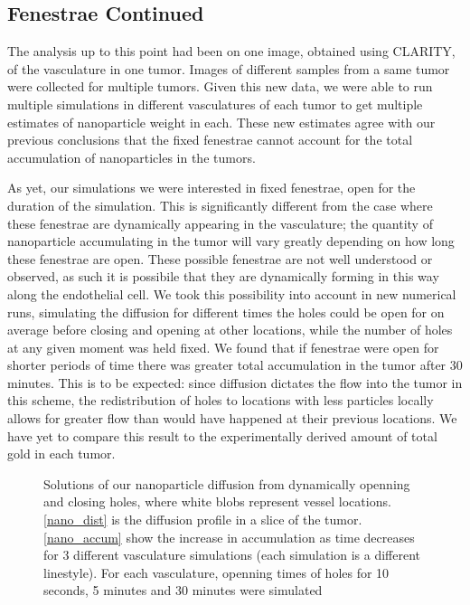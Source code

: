 \subsection{Fenestrae Continued}

The analysis up to this point had been on one image, obtained using CLARITY, of the vasculature in one tumor.
Images of different samples from a same tumor were collected for multiple tumors.
Given this new data, we were able to run multiple simulations in different vasculatures of each tumor to get multiple estimates of nanoparticle weight in each.
These new estimates agree with our previous conclusions that the fixed fenestrae cannot account for the total accumulation of nanoparticles in the tumors.

As yet, our simulations we were interested in fixed fenestrae, open for the duration of the simulation.
This is significantly different from the case where these fenestrae are dynamically appearing in the vasculature; the quantity of nanoparticle accumulating in the tumor will vary greatly depending on how long these fenestrae are open.
These possible fenestrae are not well understood or observed, as such it is possibile that they are dynamically forming in this way along the endothelial cell.
We took this possibility into account in new numerical runs, simulating the diffusion for different times the holes could be open for on average before closing and opening at other locations, while the number of holes at any given moment was held fixed.
We found that if fenestrae were open for shorter periods of time there was greater total accumulation in the tumor after 30 minutes.
This is to be expected: since diffusion dictates the flow into the tumor in this scheme, the redistribution of holes to locations with less particles locally allows for greater flow than would have happened at their previous locations.
We have yet to compare this result to the experimentally derived amount of total gold in each tumor.

\begin{figure}[h!]
\centering
{}
\caption{\label{fig:fenestrae} Solutions of our nanoparticle diffusion from dynamically openning and closing holes, where white blobs represent vessel locations. \ref{nano_dist} is the diffusion profile in a slice of the tumor. \ref{nano_accum} show the increase in accumulation as time decreases for 3 different vasculature simulations (each simulation is a different linestyle). For each vasculature, openning times of holes for 10 seconds, 5 minutes and 30 minutes were simulated }
\end{figure}


